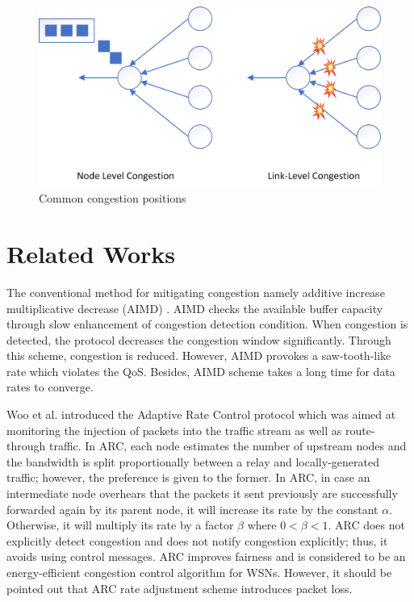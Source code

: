 \begin{figure}
	\centering
	\includegraphics[width=1\linewidth]{pics/gaktahu2}
	\caption{Common congestion positions}
	\label{fig:gaktahu2}
\end{figure}


\section{Related Works}



The conventional method for mitigating congestion namely additive increase multiplicative decrease (AIMD) \cite{CHIU19891}. AIMD checks the available buffer capacity through slow enhancement of congestion detection condition. When congestion is detected, the protocol decreases the congestion window significantly. Through this scheme, congestion is reduced. However, AIMD provokes a saw-tooth-like rate which violates the QoS. Besides, AIMD scheme takes a long time for data rates to converge.

Woo et al. \cite{Woo:2001:TCS:381677.381699} introduced the Adaptive Rate Control protocol which was aimed at monitoring the injection of packets into the traffic stream as well as route-through traffic. In ARC, each node estimates the number of upstream nodes and the bandwidth is split proportionally between a relay and locally-generated traffic; however, the preference is given to the former. In ARC, in case an intermediate node overhears that the packets it sent previously are successfully forwarded again by its parent node, it will increase its rate by the constant $ \alpha$. Otherwise, it will multiply its rate by a factor $\beta$ where $0 < \beta <1$. ARC does not explicitly detect congestion and does not notify congestion explicitly; thus, it avoids using control messages. ARC improves fairness and is considered to be an energy-efficient congestion control algorithm for WSNs. However, it should be pointed out that ARC rate adjustment scheme introduces packet loss. 

